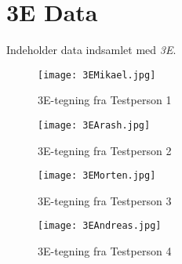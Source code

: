 \chapter{3E Data}\label{app:3E}
Indeholder data indsamlet med \textit{3E}.

\begin{figure}[h]
\centering
\texttt{[image: 3EMikael.jpg]}
\caption{3E-tegning fra Testperson 1}
\label{fig:3EMikael}
\end{figure}

\begin{figure}[h]
\centering
\texttt{[image: 3EArash.jpg]}
\caption{3E-tegning fra Testperson 2}
\label{fig:3EArash}
\end{figure}

\begin{figure}[h]
\centering
\texttt{[image: 3EMorten.jpg]}
\caption{3E-tegning fra Testperson 3}
\label{fig:3EMorten}
\end{figure}

\begin{figure}[h]
\centering
\texttt{[image: 3EAndreas.jpg]}
\caption{3E-tegning fra Testperson 4}
\label{fig:3EAndreas}
\end{figure}